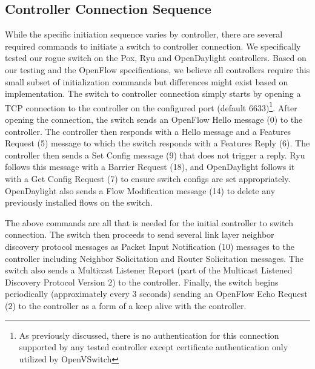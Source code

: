 \subsection {Controller Connection Sequence}
While the specific initiation sequence varies by controller, there are several required commands to initiate a switch to controller connection.  We specifically tested our rogue switch on the Pox, Ryu and OpenDaylight controllers. Based on our testing and the OpenFlow specifications, we believe all controllers require this small subset of initialization commands but differences might exist based on implementation. The switch to controller connection simply starts by opening a TCP connection to the controller on the configured port (default 6633)\footnote{As previously discussed, there is no authentication for this connection supported by any tested controller except certificate authentication only utilized by OpenVSwitch}.  After opening the connection, the switch sends an OpenFlow Hello message (0) to the controller. The controller then responds with a Hello message and a Features Request (5) message to which the switch responds with a  Features Reply (6). The controller then sends a Set Config message (9) that does not trigger a reply. Ryu follows this message with a Barrier Request (18), and OpenDaylight follows it with a  Get Config Request (7) to ensure switch configs are set appropriately. OpenDaylight also sends a Flow Modification message (14) to delete any previously installed flows on the switch.


The above commands are all that is needed for the initial controller to switch connection. The switch then proceeds to send several link layer neighbor discovery protocol messages as Packet Input Notification (10) messages to the controller including  Neighbor Solicitation and Router Solicitation messages. The switch also sends a Multicast Listener Report (part of the Multicast Listened Discovery Protocol Version 2) to the controller. Finally, the switch begins periodically (approximately every 3 seconds) sending an OpenFlow Echo Request (2) to the controller as a form of a keep alive with the controller.

